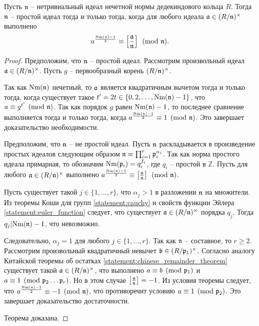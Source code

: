 \documentclass[_00_dissertation.tex]{subfiles}
\begin{document}
\begin{theorem}\label{theorem:euler_criteria}
    Пусть $\mathfrak{n}$ -- нетривиальный идеал нечетной нормы дедекиндового кольца $R$.
    Тогда $\mathfrak{n}$ -- простой идеал тогда и только тогда, когда для любого идеала $\mathfrak{a} \in (R/\mathfrak{n})^{\times}$ выполнено
    \begin{equation*}
        a^{\frac{\textrm{Nm}(\mathfrak{n}) - 1}{2}} \equiv \left[\frac{\mathfrak{a}}{\mathfrak{n}}\right] \pmod{\mathfrak{n}}.
    \end{equation*}
\end{theorem}
\begin{proof}
    Предположим, что $\mathfrak{n}$ -- простой идеал.
    Рассмотрим произвольный идеал $\mathfrak{a} \in (R/\mathfrak{n})^{\times}$.
    Пусть $g$ -- первообразный корень $(R/\mathfrak{n})^{\times}$.

    Так как $\textrm{Nm}(\mathfrak{n})$ нечетный, то $\mathfrak{a}$ является квадратичным вычетом тогда и только тогда, когда существует такое $t' = 2t \in \{0, 2, \dots, \textrm{Nm}(\mathfrak{n}) - 1\}$, что $a \equiv g^{t'} \pmod{\mathfrak{n}}$.
    Так как порядок $g$ равен $\textrm{Nm}(\mathfrak{n}) - 1$, то последнее сравнение выполняется тогда и только тогда, когда $a^{\frac{\textrm{Nm}(\mathfrak{n}) - 1}{2}} \equiv 1 \pmod{\mathfrak{n}}$.
    Это завершает доказательство необходимости.

    Предположим, что $\mathfrak{n}$ -- не простой идеал.
    Пусть $\mathfrak{n}$ раскладывается в произведение простых идеалов следующим образом $\mathfrak{n} = \prod_{i=1}^{r} \mathfrak{p}_i^{\alpha_i}$.
    Так как норма простого идеала примарная, то обозначим $\textrm{Nm}(\mathfrak{p}_i) = q_i^{f_i}$, где $q_i$ -- простой в $\mathbb{Z}$.
    Пусть для любого $\mathfrak{a} \in (R/\mathfrak{n})^{\times}$ выполнено $a^{\frac{\textrm{Nm}(\mathfrak{n}) - 1}{2}} \equiv \left[\frac{\mathfrak{a}}{\mathfrak{n}}\right] \pmod{\mathfrak{n}}$.

    Пусть существует такой $j \in \{1, \dots, r\}$, что $\alpha_j > 1$ в разложении $\mathfrak{n}$ на множители.
    Из теоремы Коши для групп \ref{statement:cauchy} и свойств функции Эйлера \ref{statement:euler_function} следует, что существует $\mathfrak{a} \in (R/\mathfrak{n})^{\times}$ порядка $q_j$.
    Тогда $q_j | \textrm{Nm}(\mathfrak{n}) - 1$, что невозможно.

    Следовательно, $\alpha_j = 1$ для любого $j \in \{1, \ldots, r\}$.
    Так как $\mathfrak{n}$ -- составное, то $r \ge 2$.
    Рассмотрим произвольный квадратичный невычет $\mathfrak{b} \in (R/\mathfrak{p}_1)^{\times}$.
    Согласно аналогу Китайской теоремы об остатках \ref{statement:chinese_remainder_theorem} существует такой $\mathfrak{a} \in (R/\mathfrak{n})^{\times}$, что выполнено $a \equiv b \pmod{\mathfrak{p}_1}$ и $a \equiv 1 \pmod{\mathfrak{p}_2\dots\mathfrak{p}_r}$.
    Но в этом случае $\left[\frac{\mathfrak{a}}{\mathfrak{n}}\right] = -1$.
    Из условия теоремы следует, что $a^{\frac{\textrm{Nm}(\mathfrak{n}) - 1}{2}} \equiv -1 \pmod{\mathfrak{n}}$, что противоречит условию $a \equiv 1 \pmod{\mathfrak{p}_2}$.
    Это завершает доказательство достаточности.

    Теорема доказана.
\end{proof}
\end{document}
